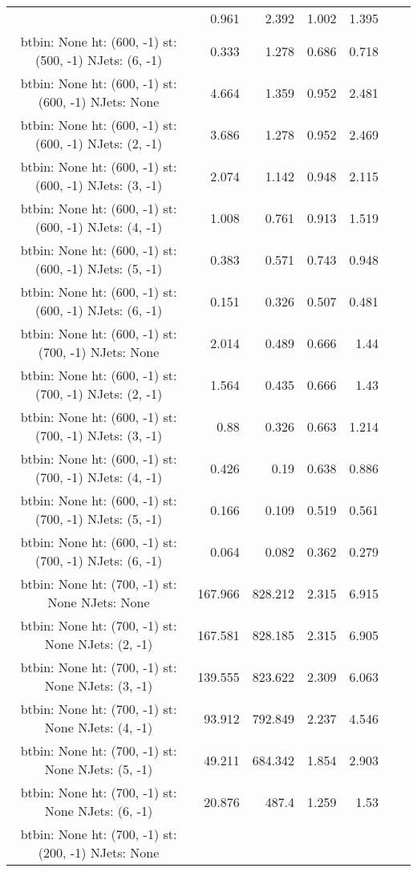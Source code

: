 \documentclass[12pt]{paper}
\begin{document}
\begin{landscape}
\begin{longtable}{c|r|r|r|r|r|r}
 & 0.961 & 2.392 & 1.002 & 1.395\\
btbin:  None ht:  (600, -1) st:  (500, -1) NJets:  (6, -1)
 & 0.333 & 1.278 & 0.686 & 0.718\\
btbin:  None ht:  (600, -1) st:  (600, -1) NJets:  None
 & 4.664 & 1.359 & 0.952 & 2.481\\
btbin:  None ht:  (600, -1) st:  (600, -1) NJets:  (2, -1)
 & 3.686 & 1.278 & 0.952 & 2.469\\
btbin:  None ht:  (600, -1) st:  (600, -1) NJets:  (3, -1)
 & 2.074 & 1.142 & 0.948 & 2.115\\
btbin:  None ht:  (600, -1) st:  (600, -1) NJets:  (4, -1)
 & 1.008 & 0.761 & 0.913 & 1.519\\
btbin:  None ht:  (600, -1) st:  (600, -1) NJets:  (5, -1)
 & 0.383 & 0.571 & 0.743 & 0.948\\
btbin:  None ht:  (600, -1) st:  (600, -1) NJets:  (6, -1)
 & 0.151 & 0.326 & 0.507 & 0.481\\
btbin:  None ht:  (600, -1) st:  (700, -1) NJets:  None
 & 2.014 & 0.489 & 0.666 & 1.44\\
btbin:  None ht:  (600, -1) st:  (700, -1) NJets:  (2, -1)
 & 1.564 & 0.435 & 0.666 & 1.43\\
btbin:  None ht:  (600, -1) st:  (700, -1) NJets:  (3, -1)
 & 0.88 & 0.326 & 0.663 & 1.214\\
btbin:  None ht:  (600, -1) st:  (700, -1) NJets:  (4, -1)
 & 0.426 & 0.19 & 0.638 & 0.886\\
btbin:  None ht:  (600, -1) st:  (700, -1) NJets:  (5, -1)
 & 0.166 & 0.109 & 0.519 & 0.561\\
btbin:  None ht:  (600, -1) st:  (700, -1) NJets:  (6, -1)
 & 0.064 & 0.082 & 0.362 & 0.279\\
btbin:  None ht:  (700, -1) st:  None NJets:  None
 & 167.966 & 828.212 & 2.315 & 6.915\\
btbin:  None ht:  (700, -1) st:  None NJets:  (2, -1)
 & 167.581 & 828.185 & 2.315 & 6.905\\
btbin:  None ht:  (700, -1) st:  None NJets:  (3, -1)
 & 139.555 & 823.622 & 2.309 & 6.063\\
btbin:  None ht:  (700, -1) st:  None NJets:  (4, -1)
 & 93.912 & 792.849 & 2.237 & 4.546\\
btbin:  None ht:  (700, -1) st:  None NJets:  (5, -1)
 & 49.211 & 684.342 & 1.854 & 2.903\\
btbin:  None ht:  (700, -1) st:  None NJets:  (6, -1)
 & 20.876 & 487.4 & 1.259 & 1.53\\
btbin:  None ht:  (700, -1) st:  (200, -1) NJets:  None

\end{longtable}
\end{landscape}
\end{document}
